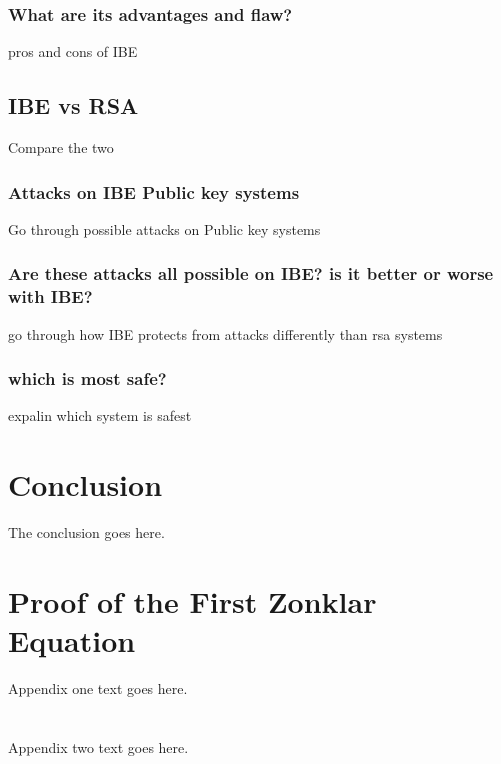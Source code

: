 \documentclass[conference]{IEEEtran}
\begin{document}
\subsubsection{What are its advantages and flaw?}
pros and cons of IBE

\subsection{IBE vs RSA}
Compare the two

\subsubsection{Attacks on IBE Public key systems}
Go through possible attacks on Public key systems

\subsubsection{Are these attacks all possible on IBE? is it better or worse with IBE?}
go through how IBE protects from attacks differently than rsa systems

\subsubsection{which is most safe?}
expalin which system is safest

\section{Conclusion}
The conclusion goes here.

\appendices
\section{Proof of the First Zonklar Equation}
Appendix one text goes here.

\section{}
Appendix two text goes here.
\end{document}
